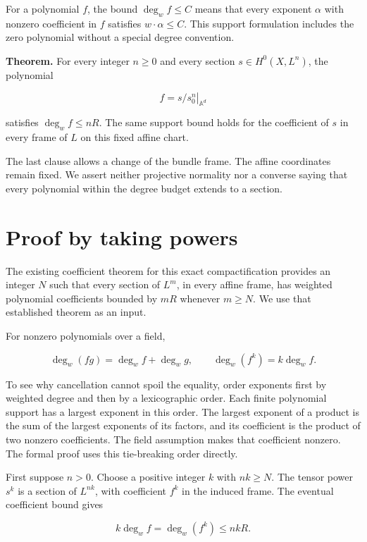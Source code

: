 \documentclass[11pt]{article}
\begin{document}
For a polynomial \(f\), the bound \(\deg_w f\leq C\) means that every exponent \(\alpha\) with nonzero coefficient in \(f\) satisfies \(w\cdot\alpha\leq C\). This support formulation includes the zero polynomial without a special degree convention.

\newpage
\begin{samepage}
\textbf{Theorem.} For every integer \(n\geq0\) and every section \(s\in H^0(X,L^n)\), the polynomial

\[
f=\left.s/s_0^n\right|_{\mathbb A^d}
\]

satisfies \(\deg_w f\leq nR\). The same support bound holds for the coefficient of \(s\) in every frame of \(L\) on this fixed affine chart.
\end{samepage}

The last clause allows a change of the bundle frame. The affine coordinates remain fixed. We assert neither projective normality nor a converse saying that every polynomial within the degree budget extends to a section.

\section{Proof by taking powers}

The existing coefficient theorem for this exact compactification provides an integer \(N\) such that every section of \(L^m\), in every affine frame, has weighted polynomial coefficients bounded by \(mR\) whenever \(m\geq N\). We use that established theorem as an input.

For nonzero polynomials over a field,

\[
\deg_w(fg)=\deg_w f+\deg_w g,
\qquad \deg_w(f^k)=k\deg_w f.
\]

To see why cancellation cannot spoil the equality, order exponents first by weighted degree and then by a lexicographic order. Each finite polynomial support has a largest exponent in this order. The largest exponent of a product is the sum of the largest exponents of its factors, and its coefficient is the product of two nonzero coefficients. The field assumption makes that coefficient nonzero. The formal proof uses this tie-breaking order directly.

First suppose \(n>0\). Choose a positive integer \(k\) with \(nk\geq N\). The tensor power \(s^k\) is a section of \(L^{nk}\), with coefficient \(f^k\) in the induced frame. The eventual coefficient bound gives

\[
k\deg_w f=\deg_w(f^k)\leq nkR.
\]
\end{document}
